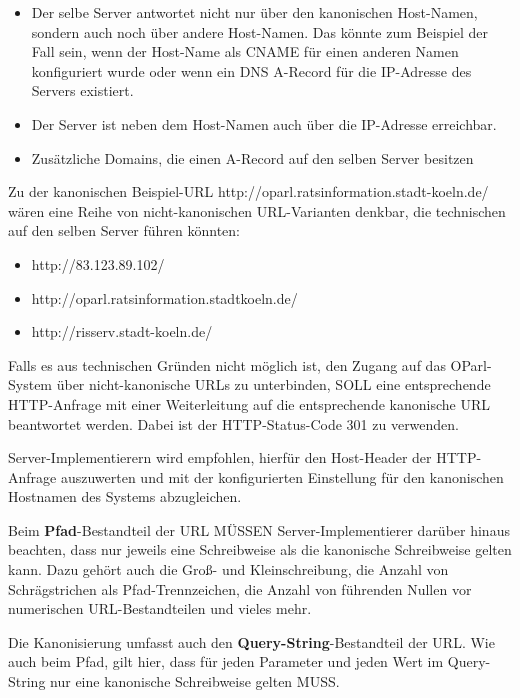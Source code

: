 \documentclass[,a4paper]{article}
\begin{document}
\begin{itemize}
\item
  Der selbe Server antwortet nicht nur über den kanonischen Host-Namen,
  sondern auch noch über andere Host-Namen. Das könnte zum Beispiel der
  Fall sein, wenn der Host-Name als CNAME für einen anderen Namen
  konfiguriert wurde oder wenn ein DNS A-Record für die IP-Adresse des
  Servers existiert.
\item
  Der Server ist neben dem Host-Namen auch über die IP-Adresse
  erreichbar.
\item
  Zusätzliche Domains, die einen A-Record auf den selben Server besitzen
\end{itemize}

Zu der kanonischen Beispiel-URL
http://oparl.ratsinformation.stadt-koeln.de/ wären eine Reihe von
nicht-kanonischen URL-Varianten denkbar, die technischen auf den selben
Server führen könnten:

\begin{itemize}
\itemsep1pt\parskip0pt
\item
  http://83.123.89.102/
\item
  http://oparl.ratsinformation.stadtkoeln.de/
\item
  http://risserv.stadt-koeln.de/
\end{itemize}

Falls es aus technischen Gründen nicht möglich ist, den Zugang auf das
OParl-System über nicht-kanonische URLs zu unterbinden, SOLL eine
entsprechende HTTP-Anfrage mit einer Weiterleitung auf die entsprechende
kanonische URL beantwortet werden. Dabei ist der HTTP-Status-Code 301 zu
verwenden.

Server-Implementierern wird empfohlen, hierfür den Host-Header der
HTTP-Anfrage auszuwerten und mit der konfigurierten Einstellung für den
kanonischen Hostnamen des Systems abzugleichen.

Beim \textbf{Pfad}-Bestandteil der URL MÜSSEN Server-Implementierer
darüber hinaus beachten, dass nur jeweils eine Schreibweise als die
kanonische Schreibweise gelten kann. Dazu gehört auch die Groß- und
Kleinschreibung, die Anzahl von Schrägstrichen als Pfad-Trennzeichen,
die Anzahl von führenden Nullen vor numerischen URL-Bestandteilen und
vieles mehr.

Die Kanonisierung umfasst auch den \textbf{Query-String}-Bestandteil der
URL. Wie auch beim Pfad, gilt hier, dass für jeden Parameter und jeden
Wert im Query-String nur eine kanonische Schreibweise gelten MUSS.
\end{document}
